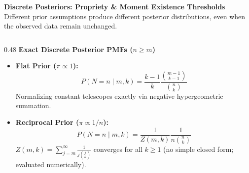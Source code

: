 \documentclass[aspectratio=169,10pt]{beamer}
\begin{document}
\begin{frame}[c]
  \begin{center}
    {\large \textbf{\color{headernavy} Discrete Posteriors: Propriety \& Moment Existence Thresholds}}\\[0.10cm]
    {\scriptsize \color{subgray} Different prior assumptions produce different posterior distributions, even when the observed data remain unchanged.}
  \end{center}
  \vspace{0.32cm}
  
  \begin{columns}[t,onlytextwidth]
    \begin{column}{0.48\textwidth}
      {\small \textbf{\color{headernavy} Exact Discrete Posterior PMFs ($n \ge m$)}}\\[0.08cm]
      {\scriptsize
      \begin{itemize}
        \setlength{\itemsep}{0.08cm}
        \item \textbf{Flat Prior ($\pi \propto 1$):}
        \begin{equation*}
          P(N = n \mid m, k) = \frac{k - 1}{k} \frac{\binom{m-1}{k-1}}{\binom{n}{k}}
        \end{equation*}
        Normalizing constant telescopes exactly via negative hypergeometric summation.
        \item \textbf{Reciprocal Prior ($\pi \propto 1/n$):}
        \begin{equation*}
          P(N = n \mid m, k) = \frac{1}{Z(m,k)} \frac{1}{n \binom{n}{k}}
        \end{equation*}
        $Z(m,k) = \sum_{j=m}^\infty \frac{1}{j \binom{j}{k}}$ converges for all $k \ge 1$ (no simple closed form; evaluated numerically).
      \end{itemize}}
    \end{column}
    

\end{columns}
\end{frame}
\end{document}
